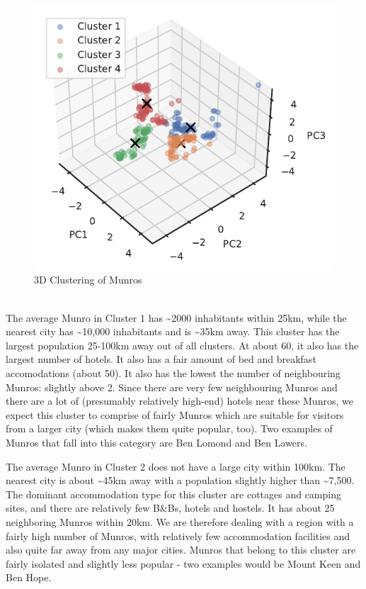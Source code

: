 \documentclass[11pt,a4paper]{article}
\begin{document}
\begin{figure} [h!]
  \centering
  \includegraphics{report/3d_clusters.pdf}
  \caption{3D Clustering of Munros}
  \label{fds-project-template:fig:3d_clusters}
\end{figure} \\
The average Munro in Cluster 1 has \textasciitilde 2000 inhabitants within 25km, while the nearest city has \textasciitilde 10,000 inhabitants and is \textasciitilde 35km away. This cluster has the largest population 25-100km away out of all clusters. At about 60, it also has the largest number of hotels. It also has a fair amount of bed and breakfast accomodations (about 50). It also has the lowest the number of neighbouring Munros: slightly above 2. Since there are very few neighbouring Munros and there are a lot of (presumably relatively high-end) hotels near these Munros, we expect this cluster to comprise of fairly  Munros which are suitable for visitors from a larger city (which makes them quite popular, too). Two examples of Munros that fall into this category are Ben Lomond and Ben Lawers.

The average Munro in Cluster 2 does not have a large city within 100km. The nearest city is about \textasciitilde 45km away with a population slightly higher than \textasciitilde 7,500. The dominant accommodation type for this cluster are cottages and camping sites, and there are relatively few B&Bs, hotels and hostels. It has about 25 neighboring Munros within 20km. We are therefore dealing with a region with a fairly high number of Munros, with relatively few accommodation facilities and also quite far away from any major cities. Munros that belong to this cluster are fairly isolated and slightly less popular - two examples would be Mount Keen and Ben Hope.
\end{document}
